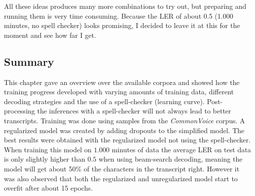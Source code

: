 All these ideas produces many more combinations to try out, but preparing and running them is very time consuming. Because the \ac{LER} of about 0.5 (1.000 minutes, no spell checker) looks promising, I decided to leave it at this for the moment and see how far I get.

\subsection{Summary}

This chapter gave an overview over the available corpora and showed how the training progress developed with varying amounts of training data, different decoding strategies and the use of a spell-checker (learning curve). Post-processing the inferences with a spell-checker will not always lead to better transcripts. Training was done using samples from the \textit{CommonVoice} corpus. A regularized model was created by adding dropouts to the simplified model. The best results were obtained with the regularized model not using the spell-checker. When training this model on $1.000$ minutes of data the average \ac{LER} on test data is only slightly higher than $0.5$ when using beam-search decoding, meaning the model will get about 50\% of the characters in the transcript right. However it was also observed that both the regularized and unregularized model start to overfit after about 15 epochs.
